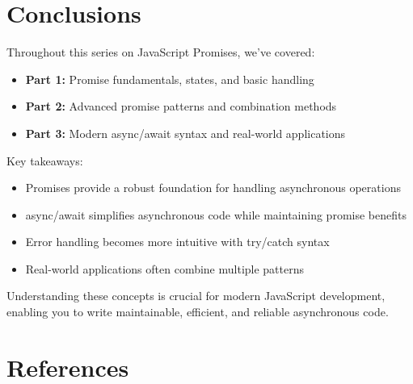 \documentclass[12pt,letterpaper]{article}
\begin{document}
\section{Conclusions}

Throughout this series on JavaScript Promises, we've covered:

\begin{itemize}
    \item \textbf{Part 1:} Promise fundamentals, states, and basic handling
    \item \textbf{Part 2:} Advanced promise patterns and combination methods
    \item \textbf{Part 3:} Modern async/await syntax and real-world applications
\end{itemize}

Key takeaways:
\begin{itemize}
    \item Promises provide a robust foundation for handling asynchronous operations
    \item async/await simplifies asynchronous code while maintaining promise benefits
    \item Error handling becomes more intuitive with try/catch syntax
    \item Real-world applications often combine multiple patterns
\end{itemize}

Understanding these concepts is crucial for modern JavaScript development, enabling you to write maintainable, efficient, and reliable asynchronous code.

\section{References}
\end{document}
